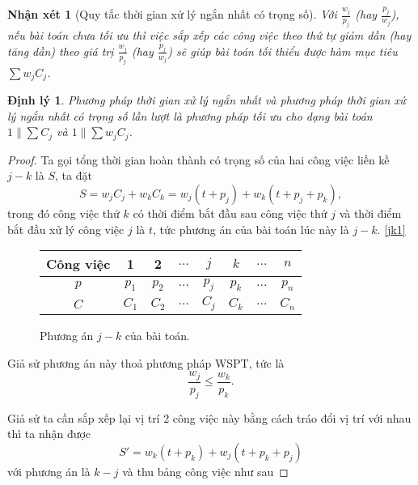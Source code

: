 \documentclass[12pt,a4paper]{report}
\newtheorem{dl}{Định lý}
\newtheorem{nx}{Nhận xét}
\begin{document}
\begin{nx}[Quy tắc thời gian xử lý ngắn nhất có trọng số]
Với $\frac{w_j}{p_j}$ (hay $\frac{p_j}{w_j}$), nếu bài toán chưa tối ưu thì việc sắp xếp các công việc theo thứ tự giảm dần (hay tăng dần) theo giá trị $\frac{w_j}{p_j}$ (hay $\frac{p_j}{w_j}$) sẽ giúp bài toán tối thiểu được hàm mục tiêu $\sum w_j C_j$.
\end{nx}

\begin{dl}
	Phương pháp thời gian xử lý ngắn nhất và phương pháp thời gian xử lý ngắn nhất có trọng số lần lượt là phương pháp tối ưu cho dạng bài toán $1 \| \sum C_j$ và $1 \| \sum w_j C_j$.
\end{dl}

\begin{proof}
	Ta gọi tổng thời gian hoàn thành có trọng số của hai công việc liền kề $j-k$ là $S$, ta đặt
	\begin{equation} \label{S}
		S = w_j C_j + w_k C_k = w_j(t+p_j) + w_k(t+p_j+p_k),
	\end{equation}
	trong đó công việc thứ $k$ có thời điểm bắt đầu sau công việc thứ $j$ và thời điểm bắt đầu xử lý công việc $j$ là $t$, tức phương án của bài toán lúc này là $j - k$. \eqref{jk1}
	
	\begin{figure}[h!]
		\centering
		 \begin{tabular}{|c | c c c c c c c |} 
		 \hline
		 Công việc & 1 & 2 & $\ldots$ & $j$ & $k$ & $\ldots$ & $n$ \\
		 \hline\hline
		 $p$ & $p_1$ & $p_2$ & $\ldots$ & $p_j$ & $p_k$ & $\ldots$ & $p_n$ \\
		 $C$ & $C_1$ & $C_2$ & $\ldots$ & $C_j$ & $C_k$ & $\ldots$ & $C_n$ \\
		 \hline
		 \end{tabular}
	\caption{\label{jk1}Phương án $j - k$ của bài toán.}
	\end{figure}
	
	Giả sử phương án này thoả phương pháp WSPT, tức là
	\begin{equation}
	\frac{w_j}{p_j} \leq \frac{w_k}{p_k}.
	\end{equation}
	
	Giả sử ta cần sắp xếp lại vị trí 2 công việc này bằng cách tráo đổi vị trí với nhau thì ta nhận được
	\begin{equation} \label{S'}
		S' = w_k(t+p_k) + w_j(t+p_k+p_j)
	\end{equation}
	với phương án là $k-j$ và thu bảng công việc như sau
	

\end{proof}
\end{document}
